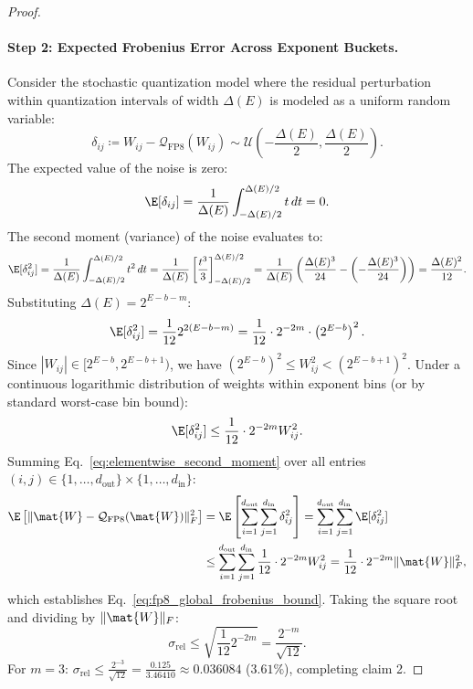 \begin{proof}
\paragraph{Step 2: Expected Frobenius Error Across Exponent Buckets.}
Consider the stochastic quantization model where the residual perturbation within quantization intervals of width $\Delta(E)$ is modeled as a uniform random variable:
\begin{equation}
\delta_{ij} \coloneqq W_{ij} - \mathcal{Q}_{\text{FP8}}(W_{ij}) \sim \mathcal{U}\left( -\frac{\Delta(E)}{2}, \frac{\Delta(E)}{2} \right).
\end{equation}
The expected value of the noise is zero:
\begin{equation}
\E[\delta_{ij}] = \frac{1}{\Delta(E)} \int_{-\Delta(E)/2}^{\Delta(E)/2} t \, dt = 0.
\end{equation}
The second moment (variance) of the noise evaluates to:
\begin{equation}
\E[\delta_{ij}^2] = \frac{1}{\Delta(E)} \int_{-\Delta(E)/2}^{\Delta(E)/2} t^2 \, dt = \frac{1}{\Delta(E)} \left[ \frac{t^3}{3} \right]_{-\Delta(E)/2}^{\Delta(E)/2} = \frac{1}{\Delta(E)} \left( \frac{\Delta(E)^3}{24} - \left(-\frac{\Delta(E)^3}{24}\right) \right) = \frac{\Delta(E)^2}{12}.
\label{eq:uniform_noise_variance}
\end{equation}
Substituting $\Delta(E) = 2^{E - b - m}$:
\begin{equation}
\E[\delta_{ij}^2] = \frac{1}{12} 2^{2(E - b - m)} = \frac{1}{12} \cdot 2^{-2m} \cdot \left( 2^{E - b} \right)^2.
\end{equation}
Since $|W_{ij}| \in [2^{E - b}, 2^{E - b + 1})$, we have $(2^{E - b})^2 \le W_{ij}^2 < (2^{E - b + 1})^2$.
Under a continuous logarithmic distribution of weights within exponent bins (or by standard worst-case bin bound):
\begin{equation}
\E[\delta_{ij}^2] \le \frac{1}{12} \cdot 2^{-2m} W_{ij}^2.
\label{eq:elementwise_second_moment}
\end{equation}
Summing Eq.~\eqref{eq:elementwise_second_moment} over all entries $(i, j) \in \{1, \dots, d_{\text{out}}\} \times \{1, \dots, d_{\text{in}}\}$:
\begin{align}
\E\left[ \|\mat{W} - \mathcal{Q}_{\text{FP8}}(\mat{W})\|_F^2 \right] &= \E\left[ \sum_{i=1}^{d_{\text{out}}} \sum_{j=1}^{d_{\text{in}}} \delta_{ij}^2 \right] = \sum_{i=1}^{d_{\text{out}}} \sum_{j=1}^{d_{\text{in}}} \E[\delta_{ij}^2] \nonumber \\
&\le \sum_{i=1}^{d_{\text{out}}} \sum_{j=1}^{d_{\text{in}}} \frac{1}{12} \cdot 2^{-2m} W_{ij}^2 = \frac{1}{12} \cdot 2^{-2m} \|\mat{W}\|_F^2,
\end{align}
which establishes Eq.~\eqref{eq:fp8_global_frobenius_bound}.
Taking the square root and dividing by $\|\mat{W}\|_F$:
\begin{equation}
\sigma_{\text{rel}} \le \sqrt{\frac{1}{12} 2^{-2m}} = \frac{2^{-m}}{\sqrt{12}}.
\end{equation}
For $m=3$: $\sigma_{\text{rel}} \le \frac{2^{-3}}{\sqrt{12}} = \frac{0.125}{3.46410} \approx 0.036084$ ($3.61\%$), completing claim 2.


\end{proof}
